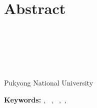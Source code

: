\clearpage
\chapter[Abstract]{\huge Abstract}

\begin{center}
{\huge \bfseries \titleEN} \\
\end{center}

\vspace{1cm}

\hspace{9cm}
\begin{minipage}{5.5cm}
	\par\authorEN\\
	\vspace{-6ex}
	\par\major\\
	\vspace{-6ex}
	\par
	 Pukyong National University\\
\end{minipage}

\vspace{5mm}

\lipsum[2-4]




\vspace*{5cm}
{\bfseries Keywords: } \underline{\keyworda}, \ \underline{\keywordb}, \ \underline{\keywordc},\ \underline{\keywordd}, \ \underline{\keyworde}


